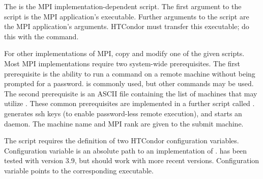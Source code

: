 The  is the MPI implementation-dependent script.
The first argument to the script is the MPI application's 
executable.
Further arguments to the script are the MPI application's arguments.
HTCondor must transfer this executable;
do this with the  command.

For other implementations of MPI,
copy and modify one of the given scripts.
Most MPI implementations require two system-wide prerequisites.
The first prerequisite is the ability to run a command
on a remote machine without being prompted for a password.
 is commonly used, but other
commands may be used.
The second prerequisite is an ASCII file containing the
list of machines that may utilize .
These common prerequisites are implemented in a further script
called .
 generates ssh keys 
(to enable password-less remote execution),
and starts an  daemon.
The machine name and MPI rank are given to the submit machine.


The  script requires the definition of
two HTCondor configuration variables.
Configuration variable  is an absolute path to
an implementation of .
 has been tested with  version 3.9,
but should work with more recent versions.
Configuration variable  points
to the corresponding  executable.

